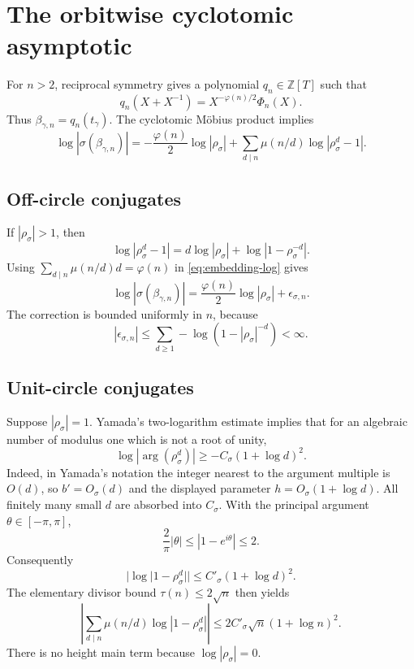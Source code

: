\section{The orbitwise cyclotomic asymptotic}

For $n>2$, reciprocal symmetry gives a polynomial $q_n\in\mathbb Z[T]$
such that
\begin{equation}
 q_n(X+X^{-1})=X^{-\varphi(n)/2}\Phi_n(X).
 \label{eq:q-poly}
\end{equation}
Thus $\beta_{\gamma,n}=q_n(t_\gamma)$.  The cyclotomic M\"obius product
implies
\begin{equation}
 \log|\sigma(\beta_{\gamma,n})|
 =-\frac{\varphi(n)}2\log|\rho_\sigma|
 +\sum_{d\mid n}\mu(n/d)\log|\rho_\sigma^d-1|.
 \label{eq:embedding-log}
\end{equation}

\subsection{Off-circle conjugates}

If $|\rho_\sigma|>1$, then
\[
 \log|\rho_\sigma^d-1|
 =d\log|\rho_\sigma|+\log|1-\rho_\sigma^{-d}|.
\]
Using $\sum_{d\mid n}\mu(n/d)d=\varphi(n)$ in
\eqref{eq:embedding-log} gives
\begin{equation}
 \log|\sigma(\beta_{\gamma,n})|
 =\frac{\varphi(n)}2\log|\rho_\sigma|
 +\epsilon_{\sigma,n}.
 \label{eq:off-circle}
\end{equation}
The correction is bounded uniformly in $n$, because
\[
 |\epsilon_{\sigma,n}|
 \le\sum_{d\ge1}-\log(1-|\rho_\sigma|^{-d})<\infty.
\]

\subsection{Unit-circle conjugates}

Suppose $|\rho_\sigma|=1$.  Yamada's two-logarithm estimate
\citep[Theorem~1.2 and consequence (15)]{Yamada2025} implies that for an
algebraic number of modulus one which is not a root of unity,
\[
 \log|\arg(\rho_\sigma^d)|
 \ge-C_\sigma(1+\log d)^2.
\]
Indeed, in Yamada's notation the integer nearest to the argument multiple is
$O(d)$, so $b'=O_\sigma(d)$ and the displayed parameter
$h=O_\sigma(1+\log d)$.  All finitely many small $d$ are absorbed into
$C_\sigma$.
With the principal argument $\theta\in[-\pi,\pi]$,
\[
 \frac2\pi|\theta|\le|1-e^{i\theta}|\le2.
\]
Consequently
\begin{equation}
 |\log|1-\rho_\sigma^d||
 \le C'_\sigma(1+\log d)^2.
 \label{eq:unit-bound}
\end{equation}
The elementary divisor bound $\tau(n)\le2\sqrt n$ then yields
\begin{equation}
 \left|
 \sum_{d\mid n}\mu(n/d)\log|1-\rho_\sigma^d|
 \right|
 \le2C'_\sigma\sqrt n(1+\log n)^2.
 \label{eq:unit-sum}
\end{equation}
There is no height main term because $\log|\rho_\sigma|=0$.

